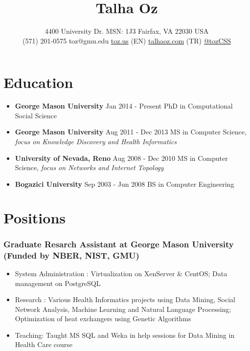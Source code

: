 \documentclass[11pt, letter]{article}
\title{Talha Oz}
\author{4400 University Dr. MSN: 1J3 \textbar{} Fairfax, VA 22030 USA\\ 
(571) 201-0575 \textbar{} toz@gmu.edu 
\href{http://toz.us}{toz.us} (EN) \textbar{}
\href{http://talhaoz.com}{talhaoz.com} (TR) \textbar{}
\href{http://twitter.com/tozCSS}{@tozCSS} }
\date{} %
\begin{document}
\maketitle
\begin{raggedright}
\vspace{-15mm}

\section{Education}\label{education}

\begin{itemize}
\itemsep1pt\parskip0pt
\item
  \textbf{George Mason University} Jan 2014 - Present PhD in
  Computational Social Science
\item
  \textbf{George Mason University} Aug 2011 - Dec 2013 MS in Computer
  Science, \emph{focus on Knowledge Discovery and Health Informatics}
\item
  \textbf{University of Nevada, Reno} Aug 2008 - Dec 2010 MS in Computer
  Science, \emph{focus on Networks and Internet Topology}
\item
  \textbf{Bogazici University} Sep 2003 - Jun 2008 BS in Computer
  Engineering
\end{itemize}

\section{Positions}\label{positions}

\subsubsection{Graduate Resarch Assistant at George Mason University
(Funded by NBER, NIST,
GMU)}\label{graduate-resarch-assistant-at-george-mason-university-funded-by-nber-nist-gmu}

\begin{itemize}
\itemsep1pt\parskip0pt
\item
  System Administration : Virtualization on XenServer \& CentOS; Data
  management on PostgreSQL
\item
  Research : Various Health Informatics projects using Data Mining,
  Social Network Analysis, Machine Learning and Natural Language
  Processing; Optimization of heat exchangers using Genetic Algorithms
\item
  Teaching: Taught MS SQL and Weka in help sessions for Data Mining in
  Health Care course
\end{itemize}


\end{raggedright}
\end{document}
